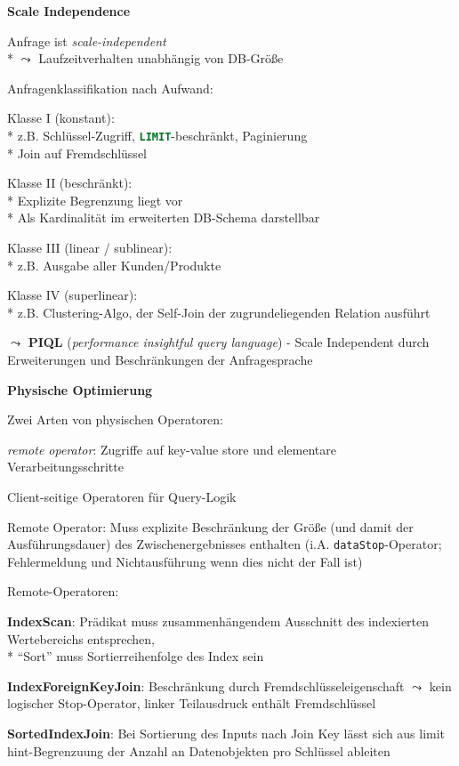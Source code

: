 \textbf{Scale Independence}
\begin{items}
	\item Anfrage ist \emph{scale-independent}
		\\*
		\( \leadsto \) Laufzeitverhalten unabhängig von DB-Größe
	\item Anfragenklassifikation nach Aufwand:
	\begin{enumeration}
		\item Klasse I (konstant):
			\\*
			z.B. Schlüssel-Zugriff, \lstinline[language=sql]{LIMIT}-beschränkt, Paginierung\\*
			Join auf Fremdschlüssel
		\item Klasse II (beschränkt):
			\\*
			Explizite Begrenzung liegt vor
			\\*
			Als Kardinalität im erweiterten DB-Schema darstellbar
		\item Klasse III (linear / sublinear):
			\\*
			z.B. Ausgabe aller Kunden/Produkte
		\item Klasse IV (superlinear):
			\\*
			z.B. Clustering-Algo, der Self-Join der zugrundeliegenden Relation ausführt
	\end{enumeration}
	\item \( \leadsto \) \textbf{PIQL} (\emph{performance insightful query language}) - Scale Independent durch Erweiterungen und Beschränkungen der Anfragesprache
\end{items}

\textbf{Physische Optimierung}
\begin{items}
	\item Zwei Arten von physischen Operatoren:
	\begin{enumeration}
		\item \emph{remote operator}: Zugriffe auf key-value store und elementare Verarbeitungsschritte
		\item Client-seitige Operatoren für Query-Logik
	\end{enumeration}
	\item Remote Operator: Muss explizite Beschränkung der Größe (und damit der Ausführungsdauer) des Zwischenergebnisses enthalten (i.A. \lstinline{dataStop}-Operator; Fehlermeldung und Nichtausführung wenn dies nicht der Fall ist)
	\item Remote-Operatoren:
	\begin{enumeration}
		\item \textbf{IndexScan}: Prädikat muss zusammenhängendem Ausschnitt des indexierten Wertebereichs entsprechen,\\*
		``Sort'' muss Sortierreihenfolge des Index sein
		\item \textbf{IndexForeignKeyJoin}: Beschränkung durch Fremdschlüsseleigenschaft \( \leadsto \) kein logischer Stop-Operator, linker Teilausdruck enthält Fremdschlüssel
		\item \textbf{SortedIndexJoin}: Bei Sortierung des Inputs nach Join Key lässt sich aus limit hint-Begrenzuung der Anzahl an Datenobjekten pro Schlüssel ableiten
	\end{enumeration}
\end{items}

